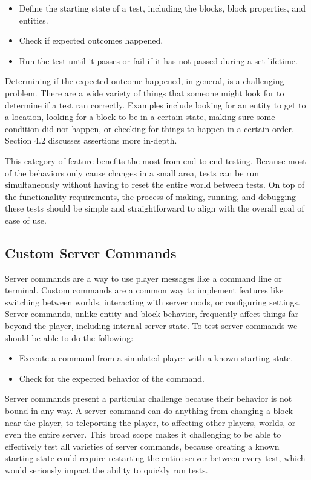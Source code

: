 \documentclass{article}
\begin{document}
\begin{onehalfspacing}
\begin{itemize}
\item
  Define the starting state of a test, including the blocks, block
  properties, and entities.
\item
  Check if expected outcomes happened.
\item
  Run the test until it passes or fail if it has not passed during a set
  lifetime.
\end{itemize}

Determining if the expected outcome happened, in general, is a
challenging problem. There are a wide variety of things that someone
might look for to determine if a test ran correctly. Examples include
looking for an entity to get to a location, looking for a block to be in
a certain state, making sure some condition did not happen, or checking
for things to happen in a certain order. Section 4.2 discusses
assertions more in-depth.

This category of feature benefits the most from end-to-end testing.
Because most of the behaviors only cause changes in a small area, tests
can be run simultaneously without having to reset the entire world
between tests. On top of the functionality requirements, the process of
making, running, and debugging these tests should be simple and
straightforward to align with the overall goal of ease of use.

\subsection{Custom Server Commands}

Server commands are a way to use player messages like a command line or
terminal. Custom commands are a common way to implement features like
switching between worlds, interacting with server mods, or configuring
settings. Server commands, unlike entity and block behavior, frequently
affect things far beyond the player, including internal server state. To
test server commands we should be able to do the following:

\begin{itemize}
\item
  Execute a command from a simulated player with a known starting state.
\item
  Check for the expected behavior of the command.
\end{itemize}

Server commands present a particular challenge because their behavior is
not bound in any way. A server command can do anything from changing a
block near the player, to teleporting the player, to affecting other
players, worlds, or even the entire server. This broad scope makes it
challenging to be able to effectively test all varieties of server
commands, because creating a known starting state could require
restarting the entire server between every test, which would seriously
impact the ability to quickly run tests.


\end{onehalfspacing}
\end{document}
